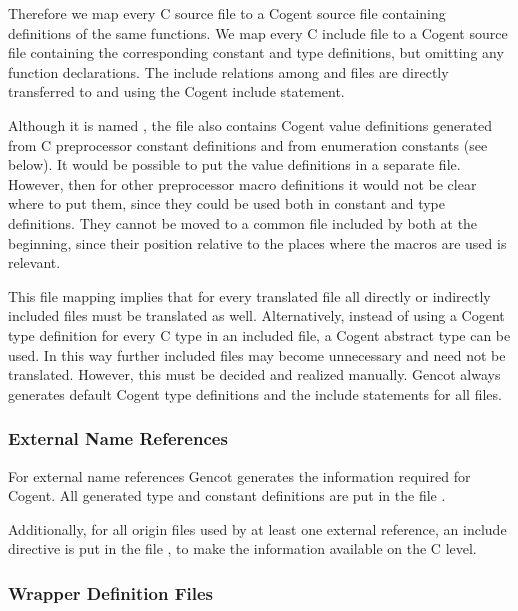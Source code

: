Therefore we map every C source file  to a Cogent source file  containing definitions of the same 
functions. We map every C include file  to a Cogent source file  
containing the corresponding constant and type definitions, but omitting any function declarations. The include relations among 
 and  files are directly transferred to  and  using the Cogent include
statement. 

Although it is named , the file also contains Cogent value definitions generated from C preprocessor
constant definitions and from enumeration constants (see below). It would be possible to put the value definitions in a 
separate file. However, then for other preprocessor macro definitions it would not be clear where to put them, since they could
be used both in constant and type definitions. They cannot be moved to a common file included by both at the beginning,
since their position relative to the places where the macros are used is relevant.

This file mapping implies that for every translated  file all directly or indirectly included  files must be 
translated as well.
Alternatively, instead of using a Cogent type definition for every C type in an included  file, a Cogent abstract type
can be used. In this way further included  files may become unnecessary and need not be translated. However, this
must be decided and realized manually. Gencot always generates default Cogent type definitions and the include statements for all
 files.

\subsubsection{External Name References}

For external name references Gencot generates the information required for Cogent. 
All generated type and constant definitions are put in the file .

Additionally, for all origin files used by at least one external reference, an include directive is put in the file
, to make the information available on the C level.

\subsubsection{Wrapper Definition Files}

